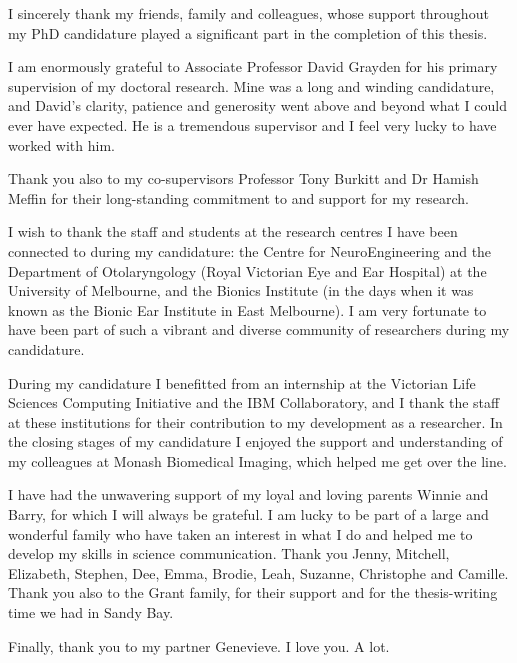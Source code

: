 
\begin{acknowledgements}

  I sincerely thank my friends, family and colleagues, whose support throughout
  my PhD candidature played a significant part in the completion of this thesis.

  I am enormously grateful to Associate Professor David Grayden for his primary
  supervision of my doctoral research. Mine was a long and winding candidature,
  and David’s clarity, patience and generosity went above and beyond what I
  could ever have expected. He is a tremendous supervisor and I feel very lucky
  to have worked with him.

  Thank you also to my co-supervisors Professor Tony Burkitt and Dr Hamish
  Meffin for their long-standing commitment to and support for my research.

  I wish to thank the staff and students at the research centres I have been
  connected to during my candidature: the Centre for NeuroEngineering and the
  Department of Otolaryngology (Royal Victorian Eye and Ear Hospital) at the
  University of Melbourne, and the Bionics Institute (in the days when it was
  known as the Bionic Ear Institute in East Melbourne). I am very fortunate to
  have been part of such a vibrant and diverse community of researchers during
  my candidature.

  During my candidature I benefitted from an internship at the Victorian Life
  Sciences Computing Initiative and the IBM Collaboratory, and I thank the staff
  at these institutions for their contribution to my development as a
  researcher. In the closing stages of my candidature I enjoyed the support and
  understanding of my colleagues at Monash Biomedical Imaging, which helped me
  get over the line.

  I have had the unwavering support of my loyal and loving parents Winnie and
  Barry, for which I will always be grateful. I am lucky to be part of a large
  and wonderful family who have taken an interest in what I do and helped me to
  develop my skills in science communication. Thank you Jenny, Mitchell,
  Elizabeth, Stephen, Dee, Emma, Brodie, Leah, Suzanne, Christophe and
  Camille. Thank you also to the Grant family, for their support and for the
  thesis-writing time we had in Sandy Bay.

  Finally, thank you to my partner Genevieve. I love you. A lot.

\end{acknowledgements}
